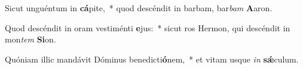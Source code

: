 \item Sicut unguéntum in \textbf{cá}pite,~* quod descéndit in barbam, bar\textit{bam} \textbf{A}aron.
\item Quod descéndit in oram vestiménti \textbf{e}jus:~* sicut ros Hermon, qui descéndit in mon\textit{tem} \textbf{Si}on.
\item Quóniam illic mandávit Dóminus benedicti\textbf{ó}nem,~* et vitam usque \textit{in} \textbf{sǽ}culum.
